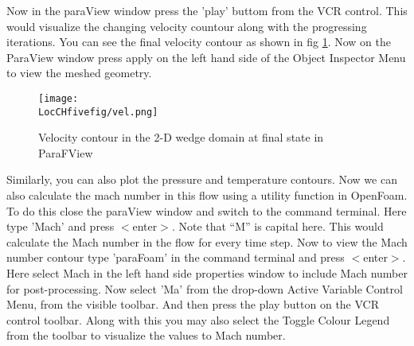 \flushleft Now in the paraView window press the 'play' buttom from the VCR control. This would visualize the changing velocity countour along with the progressing iterations. You can see the final velocity contour as shown in fig \ref{vel}. Now on the ParaView window press apply on the left hand side of the Object Inspector Menu to view the meshed geometry. 

\begin{figure}[ht]  
\begin{center}  
\texttt{[image: \\LocCHfivefig/vel.png]}
\caption{Velocity contour in the 2-D wedge domain at final state in ParaFView}
\label{vel}
\end{center}  
\end{figure}

\flushleft Similarly, you can also plot the pressure and temperature contours.
\flushleft Now we can also calculate the mach number in this flow using a utility function in OpenFoam. To do this close the paraView window and switch to the command terminal. Here type 'Mach' and press $<$enter$>$. Note that “M” is capital here. This would calculate the Mach number in the flow for every time step.
\flushleft Now to view the Mach number contour type 'paraFoam' in the command terminal and press $<$enter$>$. Here select Mach in the left hand side properties window to include Mach number for post-processing. Now select 'Ma' from the drop-down Active Variable Control Menu, from the visible toolbar. And then press the play button on the VCR control toolbar. Along with this you may also select the Toggle Colour Legend from the toolbar to visualize the values to Mach number.
